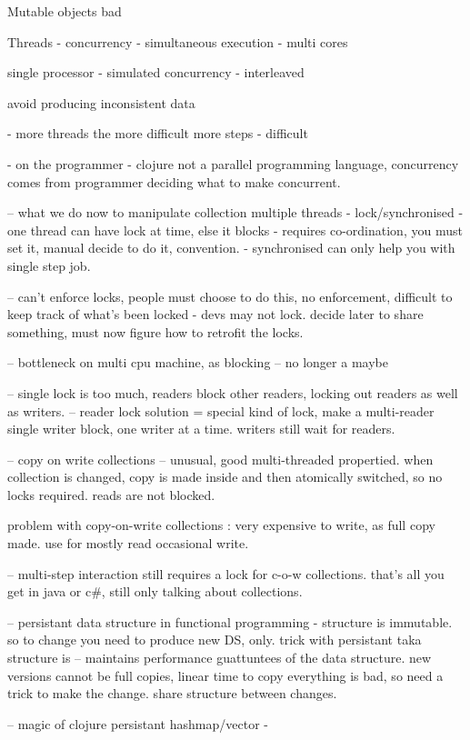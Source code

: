 \documentclass[12pt,a4paper]{article}
\begin{document}
Mutable objects bad

Threads - concurrency - simultaneous execution - multi cores 

single processor - simulated concurrency - interleaved

avoid producing inconsistent data 

- more threads the more difficult more steps - difficult

- on the programmer - clojure not a parallel programming language, concurrency comes from programmer deciding what to make concurrent.

-- what we do now to manipulate collection multiple threads
- lock/synchronised
- one thread can have lock at time, else it blocks
- requires co-ordination, you must set it, manual decide to do it, convention.
- synchronised can only help you with single step job.

-- can't enforce locks, people must choose to do this, no enforcement, difficult to keep track of what's been locked - devs may not lock. decide later to share something, must now figure how to retrofit the locks.

-- bottleneck on multi cpu machine, as blocking -- no longer a maybe

-- single lock is too much, readers block other readers, locking out readers as well as writers.
-- reader lock solution = special kind of lock, make a multi-reader single writer block, one writer at a time. writers still wait for readers.

-- copy on write collections -- unusual, good multi-threaded propertied. when collection is changed, copy is made inside and then atomically switched, so no locks required. reads are not blocked.

problem with copy-on-write collections : very expensive to write, as full copy made. use for mostly read occasional write.

-- multi-step interaction still requires a lock for c-o-w collections. that's all you get in java or c\#, still only talking about collections.

-- persistant data structure in functional programming - structure is immutable. so to change you need to produce new DS, only. trick with persistant taka structure is -- maintains performance guattuntees of the data structure. new versions cannot be full copies, linear time to copy everything is bad, so need a trick to make the change. share structure between changes. 

-- magic of clojure persistant hashmap/vector -
\end{document}
